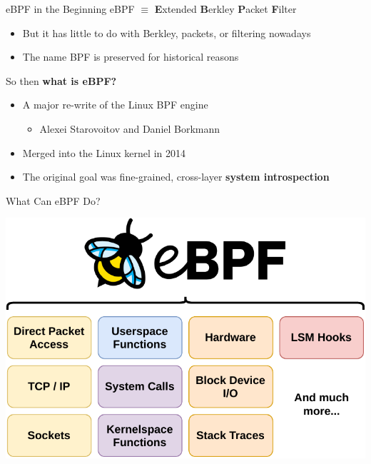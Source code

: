 \documentclass[12pt, dvipsnames, aspectratio=169]{beamer}
\begin{document}
\begin{frame}[c]{eBPF in the Beginning}
eBPF $\equiv$ \textbf{E}xtended \textbf{B}erkley \textbf{P}acket \textbf{F}ilter
\begin{itemize}
    \item But it has little to do with Berkley, packets, or filtering nowadays
    \item The name BPF is preserved for historical reasons
\end{itemize}
\vfill
So then \textbf{what is eBPF?}
\begin{itemize}
    \item A major re-write of the Linux BPF engine
    \begin{itemize}
        \item Alexei Starovoitov and Daniel Borkmann
    \end{itemize}
    \item Merged into the Linux kernel in 2014
    \item The original goal was fine-grained, cross-layer \textbf{system introspection}
\end{itemize}
\end{frame}

\begin{frame}[c]{What Can eBPF Do?}
\begin{center}
    \color{black}
    \includegraphics[height=0.8\textheight]{figs/ebpf-overview.pdf}
\end{center}
\end{frame}
\end{document}
